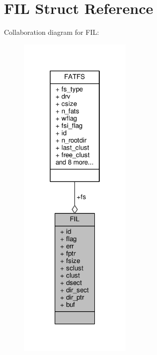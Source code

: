\hypertarget{structFIL}{\section{F\+I\+L Struct Reference}
\label{structFIL}
}


Collaboration diagram for F\+I\+L\+:
\nopagebreak
\begin{figure}[H]
\begin{center}
\leavevmode
\includegraphics[width=154pt]{structFIL__coll__graph}
\end{center}
\end{figure}
